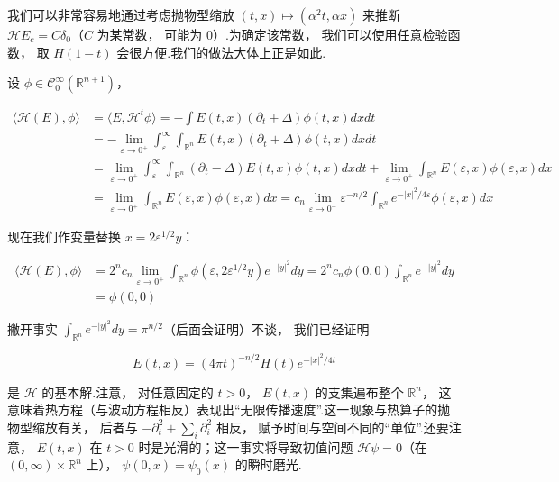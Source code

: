 我们可以非常容易地通过考虑抛物型缩放 $(t, x) \mapsto (\alpha^{2}t, \alpha x)$ 来推断 $\mathcal{H}E_{c} = C\delta_{0}$（$C$ 为某常数， 可能为 0）.为确定该常数， 我们可以使用任意检验函数， 取 $H(1-t)$ 会很方便.我们的做法大体上正是如此.

设 $\phi \in \mathcal{C}_{0}^{\infty}(\mathbb{R}^{n+1})$，

\[
\begin{aligned}
\langle \mathcal{H}(E), \phi\rangle &= \langle E, \mathcal{H}^{t}\phi\rangle = -\int E(t, x)(\partial_{t}+\Delta)\phi(t, x)dxdt \\
&= -\lim_{\varepsilon\to 0^{+}}\int_{\varepsilon}^{\infty}\int_{\mathbb{R}^{n}}E(t, x)(\partial_{t}+\Delta)\phi(t, x)dxdt \\
&= \lim_{\varepsilon\to 0^{+}}\int_{\varepsilon}^{\infty}\int_{\mathbb{R}^{n}}(\partial_{t}-\Delta)E(t, x)\phi(t, x)dxdt + \lim_{\varepsilon\to 0^{+}}\int_{\mathbb{R}^{n}}E(\varepsilon, x)\phi(\varepsilon, x)dx \\
&= \lim_{\varepsilon\to 0^{+}}\int_{\mathbb{R}^{n}}E(\varepsilon, x)\phi(\varepsilon, x)dx = c_{n}\lim_{\varepsilon\to 0^{+}}\varepsilon^{-n/2}\int_{\mathbb{R}^{n}}e^{-|x|^{2}/4\varepsilon}\phi(\varepsilon, x)dx
\end{aligned}
\]

现在我们作变量替换 $x = 2\varepsilon^{1/2}y$：

\[
\begin{aligned}
\langle \mathcal{H}(E), \phi\rangle &= 2^{n}c_{n}\lim_{\varepsilon\to 0^{+}}\int_{\mathbb{R}^{n}}\phi(\varepsilon, 2\varepsilon^{1/2}y)e^{-|y|^{2}}dy = 2^{n}c_{n}\phi(0, 0)\int_{\mathbb{R}^{n}}e^{-|y|^{2}}dy \\
&= \phi(0, 0)
\end{aligned}
\]

撇开事实 $\int_{\mathbb{R}^{n}}e^{-|y|^{2}}dy = \pi^{n/2}$（后面会证明）不谈， 我们已经证明

\begin{equation}
E(t, x) = (4\pi t)^{-n/2}H(t)e^{-|x|^{2}/4t}\label{eq:c4-153}
\end{equation}

是 $\mathcal{H}$ 的基本解.注意， 对任意固定的 $t > 0$， $E(t, x)$ 的支集遍布整个 $\mathbb{R}^{n}$， 这意味着热方程（与波动方程相反）表现出``无限传播速度''.这一现象与热算子的抛物型缩放有关， 后者与 $-\partial_{t}^{2} + \sum_{i}\partial_{i}^{2}$ 相反， 赋予时间与空间不同的``单位''.还要注意， $E(t, x)$ 在 $t > 0$ 时是光滑的；这一事实将导致初值问题 $\mathcal{H}\psi = 0$（在 $(0, \infty) \times \mathbb{R}^{n}$ 上）， $\psi(0, x) = \psi_{0}(x)$ 的瞬时磨光.

